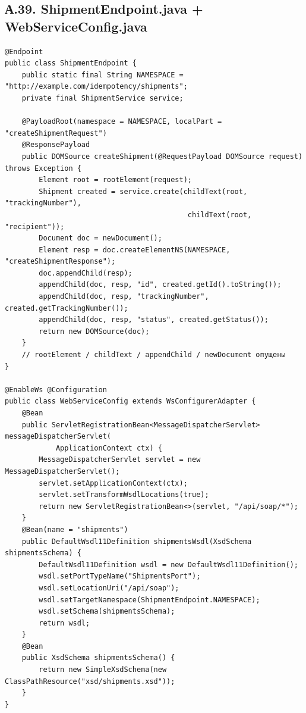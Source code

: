 \subsection*{А.39. ShipmentEndpoint.java + WebServiceConfig.java}
\begin{lstlisting}[caption={SOAP-эндпоинт и регистрация MessageDispatcherServlet}]
@Endpoint
public class ShipmentEndpoint {
    public static final String NAMESPACE = "http://example.com/idempotency/shipments";
    private final ShipmentService service;

    @PayloadRoot(namespace = NAMESPACE, localPart = "createShipmentRequest")
    @ResponsePayload
    public DOMSource createShipment(@RequestPayload DOMSource request) throws Exception {
        Element root = rootElement(request);
        Shipment created = service.create(childText(root, "trackingNumber"),
                                           childText(root, "recipient"));
        Document doc = newDocument();
        Element resp = doc.createElementNS(NAMESPACE, "createShipmentResponse");
        doc.appendChild(resp);
        appendChild(doc, resp, "id", created.getId().toString());
        appendChild(doc, resp, "trackingNumber", created.getTrackingNumber());
        appendChild(doc, resp, "status", created.getStatus());
        return new DOMSource(doc);
    }
    // rootElement / childText / appendChild / newDocument опущены
}

@EnableWs @Configuration
public class WebServiceConfig extends WsConfigurerAdapter {
    @Bean
    public ServletRegistrationBean<MessageDispatcherServlet> messageDispatcherServlet(
            ApplicationContext ctx) {
        MessageDispatcherServlet servlet = new MessageDispatcherServlet();
        servlet.setApplicationContext(ctx);
        servlet.setTransformWsdlLocations(true);
        return new ServletRegistrationBean<>(servlet, "/api/soap/*");
    }
    @Bean(name = "shipments")
    public DefaultWsdl11Definition shipmentsWsdl(XsdSchema shipmentsSchema) {
        DefaultWsdl11Definition wsdl = new DefaultWsdl11Definition();
        wsdl.setPortTypeName("ShipmentsPort");
        wsdl.setLocationUri("/api/soap");
        wsdl.setTargetNamespace(ShipmentEndpoint.NAMESPACE);
        wsdl.setSchema(shipmentsSchema);
        return wsdl;
    }
    @Bean
    public XsdSchema shipmentsSchema() {
        return new SimpleXsdSchema(new ClassPathResource("xsd/shipments.xsd"));
    }
}
\end{lstlisting}


